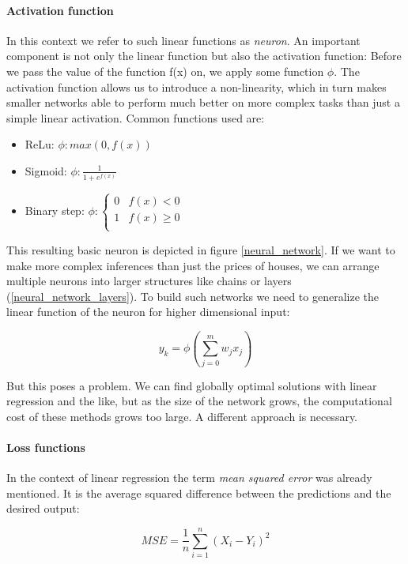 \paragraph{Activation function}
In this context we refer to such linear functions as \textit{neuron}. An important component is not only the linear function but also the activation function: Before we pass the value of the function f(x) on, we apply some function $ \phi $. The activation function allows us to introduce a non-linearity, which in turn makes smaller networks able to perform much better on more complex tasks than just a simple linear activation. Common functions used are:
\begin{itemize}
    \item ReLu: $ \phi : max(0, f(x)) $
    \item Sigmoid: $ \phi : \frac{1}{1 + e^{f(x)}} $
    \item Binary step: $ \phi : \begin{cases}
                  0 & f(x) < 0    \\
                  1 & f(x) \geq 0 \\
              \end{cases}$
\end{itemize}

This resulting basic neuron is depicted in figure \ref{neural_network}. If we want to make more complex inferences than just the prices of houses, we can arrange multiple neurons into larger structures like chains or layers (\ref{neural_network_layers}). To build such networks we need to generalize the linear function of the neuron for higher dimensional input:

$$
    y_k = \phi\left(\sum_{j=0}^{m}w_jx_j\right)
$$

But this poses a problem. We can find globally optimal solutions with linear regression and the like, but as the size of the network grows, the computational cost of these methods grows too large. A different approach is necessary.

\paragraph{Loss functions} In the context of linear regression the term \textit{mean squared error} was already mentioned. It is the average squared difference between the predictions and the desired output:

$$
    MSE = \frac{1}{n} \sum_{i = 1}^{n}(X_i - Y_i)^2
$$

